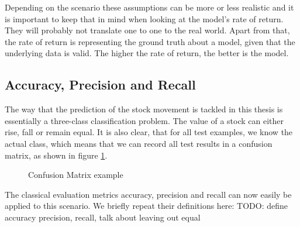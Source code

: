 Depending on the scenario these assumptions can be more or less realistic and it is important to keep that in mind when looking at the model's rate of return. They will probably not translate one to one to the real world. Apart from that, the rate of return is representing the ground truth about a model, given that the underlying data is valid. The higher the rate of return, the better is the model.

\subsection{Accuracy, Precision and Recall}
The way that the prediction of the stock movement is tackled in this thesis is essentially a three-class classification problem. The value of a stock can either rise, fall or remain equal. It is also clear, that for all test examples, we know the actual class, which means that we can record all test results in a confusion matrix, as shown in figure \ref{fig_confusionMatrix}.
\\
\begin{figure}[h]
\centering
{}
\label{fig_confusionMatrix}
\caption{Confusion Matrix example}
\end{figure}

The classical evaluation metrics accuracy, precision and recall can now easily be applied to this scenario. We briefly repeat their definitions here:
TODO: define accuracy precision, recall, talk about leaving out equal

